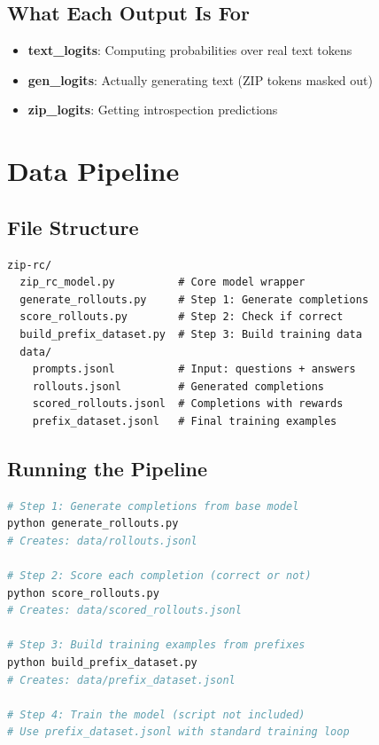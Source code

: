 \documentclass[11pt,a4paper]{article}
\begin{document}
\subsection{What Each Output Is For}

\begin{itemize}
    \item \textbf{text\_logits}: Computing probabilities over real text tokens
    \item \textbf{gen\_logits}: Actually generating text (ZIP tokens masked out)
    \item \textbf{zip\_logits}: Getting introspection predictions
\end{itemize}

\section{Data Pipeline}

\subsection{File Structure}

\begin{verbatim}
zip-rc/
  zip_rc_model.py          # Core model wrapper
  generate_rollouts.py     # Step 1: Generate completions
  score_rollouts.py        # Step 2: Check if correct
  build_prefix_dataset.py  # Step 3: Build training data
  data/
    prompts.jsonl          # Input: questions + answers
    rollouts.jsonl         # Generated completions
    scored_rollouts.jsonl  # Completions with rewards
    prefix_dataset.jsonl   # Final training examples
\end{verbatim}

\subsection{Running the Pipeline}

\begin{lstlisting}[language=bash]
# Step 1: Generate completions from base model
python generate_rollouts.py
# Creates: data/rollouts.jsonl

# Step 2: Score each completion (correct or not)
python score_rollouts.py
# Creates: data/scored_rollouts.jsonl

# Step 3: Build training examples from prefixes
python build_prefix_dataset.py
# Creates: data/prefix_dataset.jsonl

# Step 4: Train the model (script not included)
# Use prefix_dataset.jsonl with standard training loop
\end{lstlisting}
\end{document}

